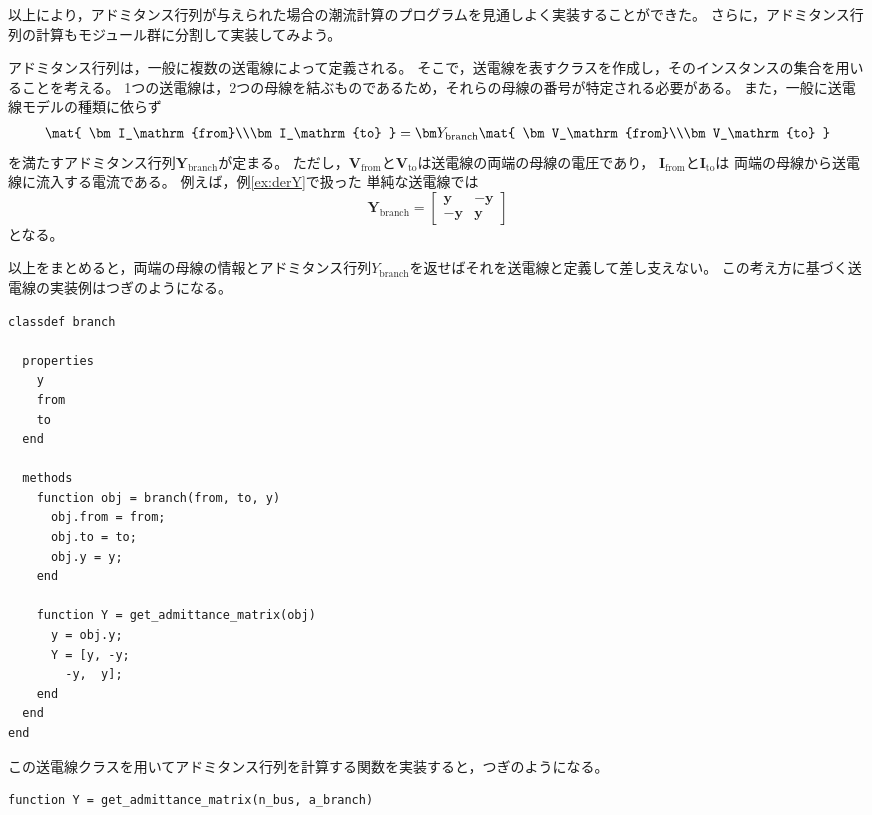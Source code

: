 \documentclass[tombow,dvipdfmx]{corona-a5-1.1}
\begin{document}
以上により，アドミタンス行列が与えられた場合の潮流計算のプログラムを見通しよく実装することができた。
さらに，アドミタンス行列の計算もモジュール群に分割して実装してみよう。

\begin{例}[オブジェクト指向によるアドミタンス行列の計算]
アドミタンス行列は，一般に複数の送電線によって定義される。
そこで，送電線を表すクラスを作成し，そのインスタンスの集合を用いることを考える。
1つの送電線は，2つの母線を結ぶものであるため，それらの母線の番号が特定される必要がある。
また，一般に送電線モデルの種類に依らず
\begin{align}
\mat{
\bm I_\mathrm{from}\\\bm I_\mathrm{to}
} =
\bm Y_\mathrm{branch}
\mat{
\bm V_\mathrm{from}\\\bm V_\mathrm{to}
}
\end{align}
を満たすアドミタンス行列$\bm Y_\mathrm{branch}$が定まる。
ただし，$\bm V_\mathrm{from}$と$\bm V_\mathrm{to}$は送電線の両端の母線の電圧であり，
$\bm I_\mathrm{from}$と$\bm I_\mathrm{to}$は
両端の母線から送電線に流入する電流である。
例えば，例\ref{ex:derY}で扱った
単純な送電線では
\[
\bm Y_\mathrm{branch} = \begin{bmatrix}
\bm y & -\bm y\\
-\bm y & \bm y
\end{bmatrix}
\]
となる。

以上をまとめると，両端の母線の情報とアドミタンス行列$Y_\mathrm{branch}$を返せばそれを送電線と定義して差し支えない。
この考え方に基づく送電線の実装例はつぎのようになる。

\smallskip
\begin{PROGRAMA}[count,title={branch.m}]\label{program:branch}
\begin{verbatim}
classdef branch
  
  properties
    y
    from
    to
  end
  
  methods
    function obj = branch(from, to, y)
      obj.from = from;
      obj.to = to;
      obj.y = y;
    end
    
    function Y = get_admittance_matrix(obj)
      y = obj.y;
      Y = [y, -y;
        -y,  y];
    end
  end
end
\end{verbatim}\end{PROGRAMA}

この送電線クラスを用いてアドミタンス行列を計算する関数を実装すると，つぎのようになる。
\smallskip
\begin{PROGRAMA}[count,title={get\_admittance\_matrix.m}]\label{program:admittance}
\begin{verbatim}
function Y = get_admittance_matrix(n_bus, a_branch)


\end{verbatim}
\end{PROGRAMA}
\end{例}
\end{document}
